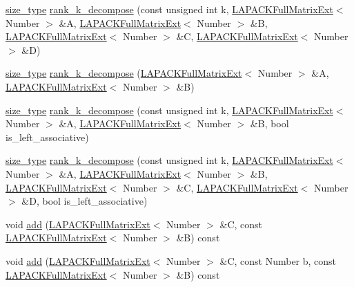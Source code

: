 \begin{DoxyCompactItemize}
\item 
\hyperlink{classLAPACKFullMatrixExt_a5cf5f4a6104dc17029210b5ca52bf574}{size\+\_\+type} \hyperlink{classLAPACKFullMatrixExt_ae37081b41ac92e7c75e7f9b42422531f}{rank\+\_\+k\+\_\+decompose} (const unsigned int k, \hyperlink{classLAPACKFullMatrixExt}{L\+A\+P\+A\+C\+K\+Full\+Matrix\+Ext}$<$ Number $>$ \&A, \hyperlink{classLAPACKFullMatrixExt}{L\+A\+P\+A\+C\+K\+Full\+Matrix\+Ext}$<$ Number $>$ \&B, \hyperlink{classLAPACKFullMatrixExt}{L\+A\+P\+A\+C\+K\+Full\+Matrix\+Ext}$<$ Number $>$ \&C, \hyperlink{classLAPACKFullMatrixExt}{L\+A\+P\+A\+C\+K\+Full\+Matrix\+Ext}$<$ Number $>$ \&D)
\item 
\hyperlink{classLAPACKFullMatrixExt_a5cf5f4a6104dc17029210b5ca52bf574}{size\+\_\+type} \hyperlink{classLAPACKFullMatrixExt_af4406db24d0924c5f7e891336bfbcffe}{rank\+\_\+k\+\_\+decompose} (\hyperlink{classLAPACKFullMatrixExt}{L\+A\+P\+A\+C\+K\+Full\+Matrix\+Ext}$<$ Number $>$ \&A, \hyperlink{classLAPACKFullMatrixExt}{L\+A\+P\+A\+C\+K\+Full\+Matrix\+Ext}$<$ Number $>$ \&B)
\item 
\hyperlink{classLAPACKFullMatrixExt_a5cf5f4a6104dc17029210b5ca52bf574}{size\+\_\+type} \hyperlink{classLAPACKFullMatrixExt_aba252fd1854009998639c21c969909d8}{rank\+\_\+k\+\_\+decompose} (const unsigned int k, \hyperlink{classLAPACKFullMatrixExt}{L\+A\+P\+A\+C\+K\+Full\+Matrix\+Ext}$<$ Number $>$ \&A, \hyperlink{classLAPACKFullMatrixExt}{L\+A\+P\+A\+C\+K\+Full\+Matrix\+Ext}$<$ Number $>$ \&B, bool is\+\_\+left\+\_\+associative)
\item 
\hyperlink{classLAPACKFullMatrixExt_a5cf5f4a6104dc17029210b5ca52bf574}{size\+\_\+type} \hyperlink{classLAPACKFullMatrixExt_a935a8f39a295ca51844f5f6669e8dc32}{rank\+\_\+k\+\_\+decompose} (const unsigned int k, \hyperlink{classLAPACKFullMatrixExt}{L\+A\+P\+A\+C\+K\+Full\+Matrix\+Ext}$<$ Number $>$ \&A, \hyperlink{classLAPACKFullMatrixExt}{L\+A\+P\+A\+C\+K\+Full\+Matrix\+Ext}$<$ Number $>$ \&B, \hyperlink{classLAPACKFullMatrixExt}{L\+A\+P\+A\+C\+K\+Full\+Matrix\+Ext}$<$ Number $>$ \&C, \hyperlink{classLAPACKFullMatrixExt}{L\+A\+P\+A\+C\+K\+Full\+Matrix\+Ext}$<$ Number $>$ \&D, bool is\+\_\+left\+\_\+associative)
\item 
void \hyperlink{classLAPACKFullMatrixExt_a824a7a919666c8af3df5723175f6201e}{add} (\hyperlink{classLAPACKFullMatrixExt}{L\+A\+P\+A\+C\+K\+Full\+Matrix\+Ext}$<$ Number $>$ \&C, const \hyperlink{classLAPACKFullMatrixExt}{L\+A\+P\+A\+C\+K\+Full\+Matrix\+Ext}$<$ Number $>$ \&B) const
\item 
void \hyperlink{classLAPACKFullMatrixExt_a793c6b5e30522c2ae653df0e80ed6ab3}{add} (\hyperlink{classLAPACKFullMatrixExt}{L\+A\+P\+A\+C\+K\+Full\+Matrix\+Ext}$<$ Number $>$ \&C, const Number b, const \hyperlink{classLAPACKFullMatrixExt}{L\+A\+P\+A\+C\+K\+Full\+Matrix\+Ext}$<$ Number $>$ \&B) const

\end{DoxyCompactItemize}
